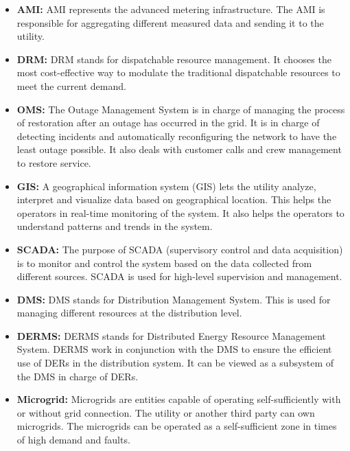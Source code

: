  \begin{itemize}
     \item \textbf{AMI:} AMI represents the advanced metering infrastructure. The AMI is responsible for aggregating different measured data and sending it to the utility.
     \item \textbf{DRM:} DRM stands for dispatchable resource management. It chooses the most cost-effective way to modulate the traditional dispatchable resources to meet the current demand.
     \item \textbf{OMS:} The Outage Management System is in charge of managing the process of restoration after an outage has occurred in the grid. It is in charge of detecting incidents and automatically reconfiguring the network to have the least outage possible. It also deals with customer calls and crew management to restore service.
     \item \textbf{GIS:} A geographical information system (GIS) lets the utility analyze, interpret and visualize data based on geographical location. This helps the operators in real-time monitoring of the system. It also helps the operators to understand patterns and trends in the system.
     \item \textbf{SCADA:} The purpose of SCADA (supervisory control and data acquisition) is to monitor and control the system based on the data collected from different sources. SCADA is used for high-level supervision and management.
     \item \textbf{DMS:} DMS stands for Distribution Management System. This is used for managing different resources at the distribution level.
     \item \textbf{DERMS:} DERMS stands for Distributed Energy Resource Management System. DERMS work in conjunction with the DMS to ensure the efficient use of DERs in the distribution system. It can be viewed as a subsystem of the DMS in charge of DERs.
     \item \textbf{Microgrid:} Microgrids are entities capable of operating self-sufficiently with or without grid connection. The utility or another third party can own microgrids. The microgrids can be operated as a self-sufficient zone in times of high demand and faults.
 \end{itemize}

